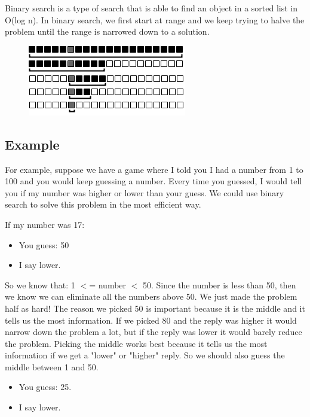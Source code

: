 \documentclass[11pt,oneside]{book}
\makeatletter
\def\maxwidth#1{\ifdim\Gin@nat@width>#1 #1\else\Gin@nat@width\fi}
\makeatother
\begin{document}
Binary search is a type of search that is able to find an object in a sorted list in O(log n). In binary search, we first start at range and we keep trying to halve the problem until the range is narrowed down to a solution.

\vspace{5px}\begin{figure}[H]\centering
        \includegraphics[width=0.66\maxwidth{\textwidth}]{binarysearch.png}
        \end{figure}

\subsection{Example}

For example, suppose we have a game where I told you I had a number from 1 to 100 and you would keep guessing a number. Every time you guessed, I would tell you if my number was higher or lower than your guess. We could use binary search to solve this problem in the most efficient way.

If my number was 17:

\begin{itemize}
\item You guess: 50
\item I say lower.
\end{itemize}

So we know that: 1 $<$= number $<$ 50. Since the number is less than 50, then we know we can eliminate all the numbers above 50. We just made the problem half as hard! The reason we picked 50 is important because it is the middle and it tells us the most information. If we picked 80 and the reply was higher it would narrow down the problem a lot, but if the reply was lower it would barely reduce the problem. Picking the middle works best because it tells us the most information if we get a "lower" or "higher" reply. So we should also guess the middle between 1 and 50.

\begin{itemize}
\item You guess: 25.
\item I say lower.
\end{itemize}
\end{document}
